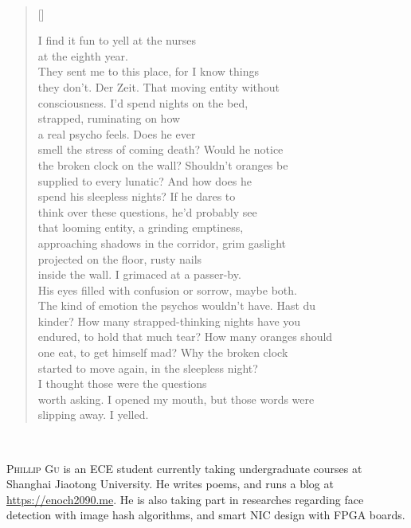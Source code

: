 \documentclass{book}
\begin{document}
\newpage
\poemtitle{\textcolor[RGB]{165,15,15}{His mind at the clockwork}}
\hspace*{\fill} \\
\settowidth{\versewidth}{endured, to hold that much tear? How many oranges should}
\begin{verse}[\versewidth]

    I find it fun to yell at the nurses\\
    at the eighth year. \\
    They sent me to this place, for I know things\\
    they don't. Der Zeit. That moving entity without\\
    consciousness. I'd spend nights on the bed,\\
    strapped, ruminating on how\\
    a real psycho feels. Does he ever \\
    smell the stress of coming death? Would he notice \\
    the broken clock on the wall? Shouldn't oranges be\\
    supplied to every lunatic? And how does he\\
    spend his sleepless nights? If he dares to \\
    think over these questions, he'd probably see \\
    that looming entity, a grinding emptiness, \\
    approaching shadows in the corridor, grim gaslight\\
    projected on the floor, rusty nails \\
    inside the wall. I grimaced at a passer-by. \\
    His eyes filled with confusion or sorrow, maybe both. \\
    The kind of emotion the psychos wouldn't have. Hast du\\
    kinder? How many strapped-thinking nights have you\\
    endured, to hold that much tear? How many oranges should\\
    one eat, to get himself mad? Why the broken clock\\
    started to move again, in the sleepless night?\\
     I thought those were the questions\\
    worth asking. I opened my mouth, but those words were\\
    slipping away. I yelled.
\end{verse}
\newpage
\poemtitle{\textcolor[RGB]{185,25,25}{About the author}}
\hspace*{\fill} \\
\par{} \textsc{Phillip Gu} is an ECE student currently taking undergraduate courses at Shanghai Jiaotong University. He writes poems, and runs a blog at \url{https://enoch2090.me}. He is also taking part in researches regarding face detection with image hash algorithms, and smart NIC design with FPGA boards. 
\end{document}
